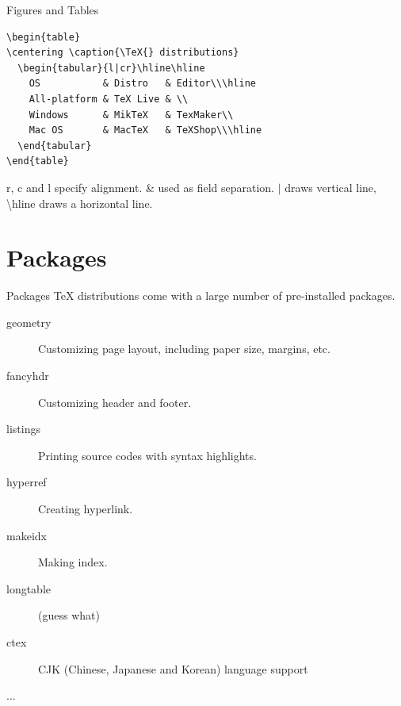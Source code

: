 \documentclass[10pt]{beamer}
\begin{document}
\begin{frame}[fragile]{Figures and Tables}
\begin{verbatim}
\begin{table}
\centering \caption{\TeX{} distributions}
  \begin{tabular}{l|cr}\hline\hline
    OS           & Distro   & Editor\\\hline
    All-platform & TeX Live & \\
    Windows      & MikTeX   & TexMaker\\
    Mac OS       & MacTeX   & TeXShop\\\hline
  \end{tabular}
\end{table}
\end{verbatim}
    \alert{r}, \alert{c} and \alert{l} specify alignment.
    \alert{\&} used as field separation. \alert{$|$} draws vertical
    line, \alert{\textbackslash hline} draws a horizontal line.
\end{frame}

\section{Packages}
\begin{frame}[t]{Packages}
    \TeX{} distributions come with a large number of pre-installed packages.
\begin{description}
    \item [geometry] Customizing page layout, including paper size,
        margins, etc.
    \item [fancyhdr] Customizing header and footer.
    \item [listings] Printing source codes with syntax highlights.
    \item [hyperref] Creating hyperlink.
    \item [makeidx] Making index.
    \item [longtable] (guess what)
    \item [ctex] CJK (Chinese, Japanese and Korean) language support
    \item [...]
\end{description}
\end{frame}
\end{document}
